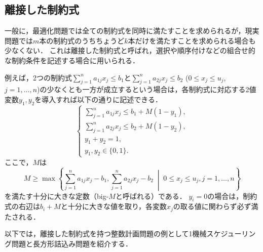 \documentclass[japanese]{jnlp_1.4}
\begin{document}
\subsection{離接した制約式}
\label{sec:disjunction}

一般に，最適化問題では全ての制約式を同時に満たすことを求められるが，現実問題では$m$本の制約式のうちちょうど$k$本だけを満たすことを求められる場合も少なくない．
これは離接した制約式と呼ばれ，選択や順序付けなどの組合せ的な制約条件を記述する場合に用いられる．

例えば，2つの制約式$\sum_{j=1}^n a_{1j} x_j \le b_1$と$\sum_{j=1}^n a_{2j} x_j \le b_2$ ($0 \le x_j \le u_j$, $j=1,\dots,n$)の少なくとも一方が成立するという場合は，各制約式に対応する2値変数$y_1, y_2$を導入すれば以下の通りに記述できる．
\begin{equation}
\left\{
\begin{array}{l}
\displaystyle\sum_{j=1}^n a_{1j} x_j \le b_1 + M(1 - y_1),\\
\displaystyle\sum_{j=1}^n a_{2j} x_j \le b_2 + M(1 - y_2),\\
y_1 + y_2 = 1,\\
y_1, y_2 \in \{ 0,1 \}.
\end{array}
\right.
\end{equation}
ここで，$M$は
\begin{equation}
M \ge \max \left\{ \sum_{j=1}^n a_{1j} x_j - b_1, \sum_{j=1}^n a_{2j} x_j - b_2 \; \middle| \; 0 \le x_j \le u_j, j=1,\dots,n \right\}
\end{equation}
を満たす十分に大きな定数（big-$M$と呼ばれる）である．
$y_i=0$の場合は，制約式の右辺は$b_i+M$と十分に大きな値を取り，各変数$x_j$の取る値に関わらず必ず満たされる．

以下では，離接した制約式を持つ整数計画問題の例として1機械スケジューリング問題と長方形詰込み問題を紹介する．
\end{document}
